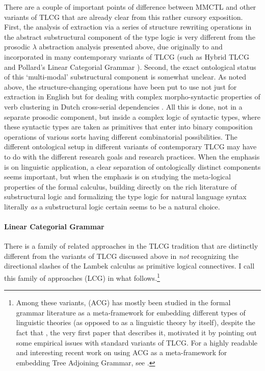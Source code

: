 \documentclass[output=paper]{langsci/langscibook}
\begin{document}
There are a couple of important points of difference between MMCTL and
other variants of TLCG that are already clear from this rather cursory
exposition. First, the analysis of extraction via a series of
structure rewriting operations in the abstract substructural component
of the type logic is very different from the prosodic $\lambda$
abstraction analysis presented above, due originally to \citet{muskens03}
and incorporated in many contemporary variants of TLCG (such as Hybrid TLCG and
Pollard's Linear Categorial Grammar \citep{mihalicek-pollard10,pollard13}).
Second, the exact ontological status of this `multi-modal'
substructural component is somewhat unclear. As noted above, the
structure-changing operations have been put to use not just for
extraction in English but for dealing with complex morpho-syntactic
properties of verb clustering in Dutch cross-serial dependencies
\citep{moortgatoehrle94}. All this is done, not in a separate prosodic
component, but inside a complex logic of syntactic types, where these
syntactic types are taken as primitives that enter into binary
composition operations of various sorts having different combinatorial
possibilities. The different ontological setup in different variants
of contemporary TLCG may have to do with the different research goals
and research practices. When the emphasis is on linguistic
application, a clear separation of ontologically distinct components
seems important, but when the emphasis is on studying the meta-logical
properties of the formal calculus, building directly on the rich
literature of substructural logic and formalizing the type logic for
natural language syntax literally \emph{as} a substructural logic certain
seems to be a natural choice.


\paragraph{Linear Categorial Grammar}

There is a family of related approaches in the TLCG tradition
\citep{oehrle1994,degroote01,muskens03,mihalicek-pollard10,pollard13} that
are distinctly different from the variants of TLCG discussed above in
\emph{not} recognizing the directional slashes of the Lambek calculus as
primitive logical connectives. I call this family of approaches
 (LCG) in what follows.\footnote{Among
these variants,  (ACG) has mostly been studied
in the formal grammar literature as a meta-framework for embedding
different types of linguistic theories (as opposed to as a linguistic
theory by itself), despite the fact that \citet{degroote01}, the very first
paper that describes it, motivated it by pointing out some empirical
issues with standard variants of TLCG. For a highly readable and
interesting recent work on
using ACG as a meta-framework for embedding Tree Adjoining Grammar,
see \citet{Pogodalla2017}.}
\end{document}
